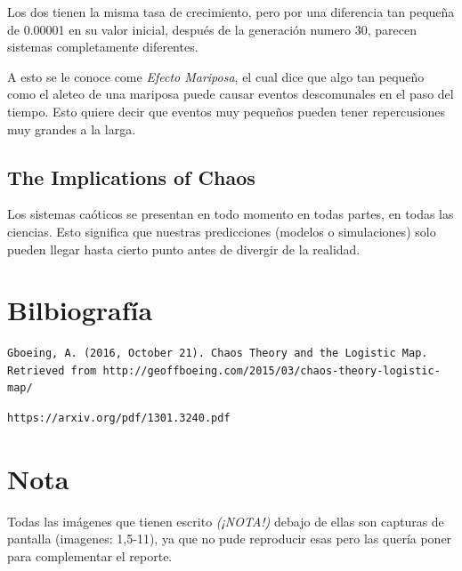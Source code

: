 \documentclass{article}
\begin{document}
Los dos tienen la misma tasa de crecimiento, pero por una diferencia tan pequeña de 0.00001 en su valor inicial, después de la generación numero 30, parecen sistemas completamente diferentes.

A esto se le conoce come \textit{Efecto Mariposa}, el cual dice que algo tan pequeño como el aleteo de una mariposa puede causar eventos descomunales en el paso del tiempo. Esto quiere decir que eventos muy pequeños pueden tener repercusiones muy grandes a la larga.

\subsection{The Implications of Chaos}
Los sistemas caóticos se presentan en todo momento en todas partes, en todas las ciencias. Esto significa que nuestras predicciones (modelos o simulaciones) solo pueden llegar hasta cierto punto antes de divergir de la realidad. 



\section{Bilbiografía}

\begin{verbatim}
Gboeing, A. (2016, October 21). Chaos Theory and the Logistic Map. 
Retrieved from http://geoffboeing.com/2015/03/chaos-theory-logistic-map/ 
\end{verbatim}

\begin{verbatim}
https://arxiv.org/pdf/1301.3240.pdf
\end{verbatim}

\vspace{0.3cm}

\section*{Nota}
Todas las imágenes que tienen escrito \textit{(¡NOTA!)} debajo de ellas son capturas de pantalla (imagenes: 1,5-11), ya que no pude reproducir esas pero las quería poner para complementar el reporte. 
\end{document}
